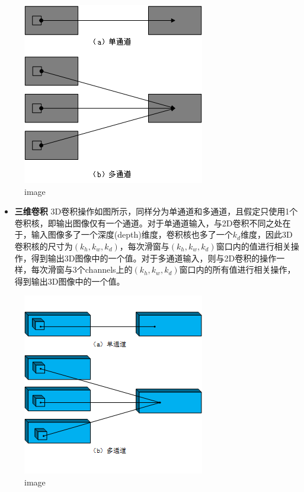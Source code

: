 \begin{figure}
\centering
\includegraphics{./img/ch5/5.6.1.png}
\caption{image}
\end{figure}

\begin{itemize}
\tightlist
\item
  \textbf{三维卷积}
  3D卷积操作如图所示，同样分为单通道和多通道，且假定只使用1个卷积核，即输出图像仅有一个通道。对于单通道输入，与2D卷积不同之处在于，输入图像多了一个深度(depth)维度，卷积核也多了一个\(k_d​\)维度，因此3D卷积核的尺寸为\((k_h, k_w, k_d)​\)，每次滑窗与\((k_h, k_w, k_d)​\)窗口内的值进行相关操作，得到输出3D图像中的一个值。对于多通道输入，则与2D卷积的操作一样，每次滑窗与3个channels上的\((k_h, k_w, k_d)​\)窗口内的所有值进行相关操作，得到输出3D图像中的一个值。
\end{itemize}

\begin{figure}
\centering
\includegraphics{./img/ch5/5.6.2.png}
\caption{image}
\end{figure}

